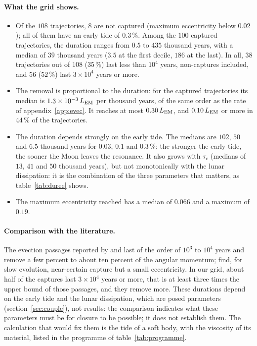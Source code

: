 \documentclass[11pt,a4paper]{article}
\newcommand{\LEM}{\ensuremath{L_{\rm EM}}}
\begin{document}
\paragraph{What the grid shows.}
\begin{itemize}
\item Of the $108$ trajectories, $8$ are not captured (maximum eccentricity below $0.02$); all of them have an early tide of $0.3\,\%$. Among the $100$ captured trajectories, the duration ranges from $0.5$ to $435$ thousand years, with a median of $39$ thousand years ($3.5$ at the first decile, $186$ at the last). In all, $38$ trajectories out of $108$ ($35\,\%$) last less than $10^4$ years, non-captures included, and $56$ ($52\,\%$) last $3\times10^4$ years or more.
\item The removal is proportional to the duration: for the captured trajectories its median is $1.3\times10^{-3}\,\LEM$ per thousand years, of the same order as the rate of appendix~\ref{app:evec}. It reaches at most $0.30\,\LEM$, and $0.10\,\LEM$ or more in $44\,\%$ of the trajectories.
\item The duration depends strongly on the early tide. The medians are $102$, $50$ and $6.5$ thousand years for $0.03$, $0.1$ and $0.3\,\%$: the stronger the early tide, the sooner the Moon leaves the resonance. It also grows with $\tau_c$ (medians of $13$, $41$ and $50$ thousand years), but not monotonically with the lunar dissipation: it is the combination of the three parameters that matters, as table~\ref{tab:duree} shows.
\item The maximum eccentricity reached has a median of $0.066$ and a maximum of $0.19$.
\end{itemize}

\paragraph{Comparison with the literature.}
The evection passages reported by \citet{WardCanupRufu2020} and \citet{RufuCanup2020} last of the order of $10^3$ to $10^4$ years and remove a few percent to about ten percent of the angular momentum; \citet{Zahnle2015} find, for slow evolution, near-certain capture but a small eccentricity. In our grid, about half of the captures last $3\times10^4$ years or more, that is at least three times the upper bound of those passages, and they remove more. These durations depend on the early tide and the lunar dissipation, which are posed parameters (section~\ref{sec:couple}), not results: the comparison indicates what these parameters must be for closure to be possible; it does not establish them. The calculation that would fix them is the tide of a soft body, with the viscosity of its material, listed in the programme of table~\ref{tab:programme}.
\end{document}
